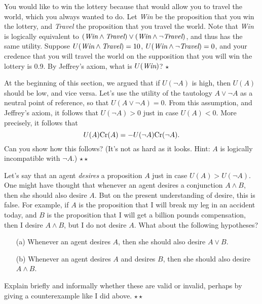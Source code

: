 \begin{exercise}
  You would like to win the lottery because that would allow you to
  travel the world, which you always wanted to do. Let \emph{Win} be
  the proposition that you win the lottery, and \emph{Travel} the
  proposition that you travel the world. Note that \emph{Win} is
  logically equivalent to $(\emph{Win} \land \emph{Travel}) \lor
  (\emph{Win} \land \neg \emph{Travel})$, and thus has the same
  utility. Suppose $U(\emph{Win} \land \emph{Travel}) = 10$,
  $U(\emph{Win} \land \neg \emph{Travel}) = 0$, and your credence that
  you will travel the world on the supposition that you will win the
  lottery is 0.9. By Jeffrey's axiom, what is $U(\emph{Win})$? $\star$
\end{exercise}

\begin{exercise}
  At the beginning of this section, we argued that if $U(\neg A)$ is
  high, then $U(A)$ should be low, and vice versa. Let's use the
  utility of the tautology $A \lor \neg A$ as a neutral point of
  reference, so that $U(A \lor \neg A) = 0$. From this assumption, and
  Jeffrey's axiom, it follows that $U(\neg A) > 0$ just in case $U(A)
  < 0$. More precisely, it follows that
  \[
  U(A)\text{Cr}(A) = - U(\neg A)\text{Cr}(\neg A).
  \]
  Can you show how this follows? (It's not as hard as it looks. Hint:
  $A$ is logically incompatible with $\neg A$.) $\star\star$
\end{exercise}

\begin{exercise}
  Let's say that an agent \emph{desires} a proposition $A$ just in
  case $U(A) > U(\neg A)$. One might have thought that whenever an
  agent desires a conjunction $A \land B$, then she should also desire
  $A$. But on the present understanding of desire, this is false. For
  example, if $A$ is the proposition that I will break my leg in an
  accident today, and $B$ is the proposition that I will get a billion
  pounds compensation, then I desire $A \land B$, but I do not desire
  $A$. What about the following hypotheses?
  \begin{enumerate}
  \item[(a)] Whenever an agent desires $A$, then she should also desire $A
    \lor B$.
  \item[(b)] Whenever an agent desires $A$ and desires $B$, then she
    should also desire $A \land B$.
  \end{enumerate}
  Explain briefly and informally whether these are valid or invalid,
  perhaps by giving a counterexample like I did above. $\star\star$
  

\end{exercise}

